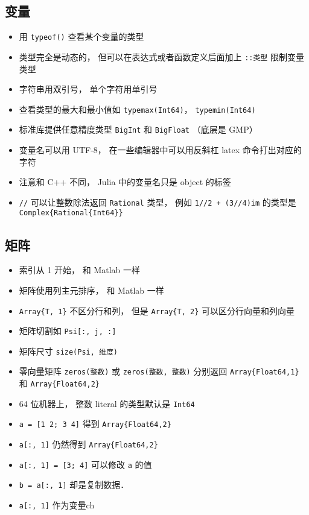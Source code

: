 \subsection{变量}
\begin{itemize}
\item 用 \verb|typeof()| 查看某个变量的类型
\item 类型完全是动态的， 但可以在表达式或者函数定义后面加上 \verb|::类型| 限制变量类型
\item 字符串用双引号， 单个字符用单引号
\item 查看类型的最大和最小值如 \verb|typemax(Int64)|， \verb|typemin(Int64)|
\item 标准库提供任意精度类型 \verb|BigInt| 和 \verb|BigFloat| （底层是 GMP）
\item 变量名可以用 UTF-8， 在一些编辑器中可以用反斜杠 latex 命令打出对应的字符
\item 注意和 C++ 不同， Julia 中的变量名只是 object 的标签
\item \verb|//| 可以让整数除法返回 \verb|Rational| 类型， 例如 \verb|1//2 + (3//4)im| 的类型是 \verb|Complex{Rational{Int64}}|
\end{itemize}

\subsection{矩阵}
\begin{itemize}
\item 索引从 1 开始， 和 Matlab 一样
\item 矩阵使用列主元排序， 和 Matlab 一样
\item \verb|Array{T, 1}| 不区分行和列， 但是 \verb|Array{T, 2}| 可以区分行向量和列向量
\item 矩阵切割如 \verb|Psi[:, j, :]|
\item 矩阵尺寸 \verb|size(Psi, 维度)|
\item 零向量矩阵 \verb|zeros(整数)| 或 \verb|zeros(整数, 整数)| 分别返回 \verb|Array{Float64,1}| 和 \verb|Array{Float64,2}|
\item 64 位机器上， 整数 literal 的类型默认是 \verb|Int64|
\item \verb|a = [1 2; 3 4]| 得到 \verb|Array{Float64,2}|
\item \verb|a[:, 1]| 仍然得到 \verb|Array{Float64,2}|
\item \verb|a[:, 1] = [3; 4]| 可以修改 \verb|a| 的值
\item \verb|b = a[:, 1]| 却是复制数据．
\item \verb|a[:, 1]| 作为变量ch
\end{itemize}

